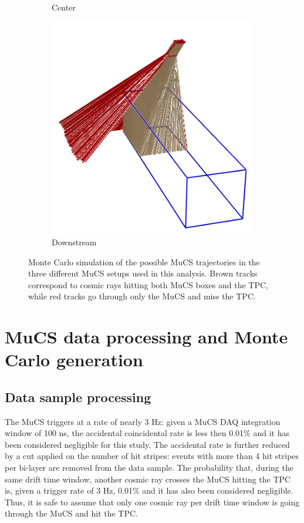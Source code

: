 \documentclass[a4paper,11pt]{article}
\begin{document}
\begin{figure}[htbp]
\begin{subfigure}{0.30\textwidth}
    \caption{Center} \label{fig:centre}
  \end{subfigure}
  \begin{subfigure}{0.30\textwidth}
    \includegraphics[width=\linewidth]{figures/downstream.png}
    \caption{Downstream} \label{fig:downstream}
  \end{subfigure}

  \caption{Monte Carlo simulation of the possible MuCS trajectories in the three different MuCS setups used in this analysis. Brown tracks correspond to cosmic rays hitting both MuCS boxes and the TPC, while red tracks go through only the MuCS and miss the TPC.} \label{fig:mucs}
\end{figure}


\section{MuCS data processing and Monte Carlo generation}\label{sec:merging}

\subsection{Data sample processing}
The MuCS triggers at a rate of nearly 3 Hz: given a MuCS DAQ integration window of 100 ns, the accidental coincidental rate is less then 0.01\% and it has been considered negligible for this study. The accidental rate is further reduced by a cut applied on the number of hit stripes: events with more than 4 hit stripes per bi-layer are removed from the data sample.
The probability that, during the same drift time window, another cosmic ray crosses the MuCS hitting the TPC is, given a trigger rate of 3 Hz, 0.01\% and it has also been considered negligible. Thus, it is safe to assume that only one cosmic ray per drift time window is going through the MuCS and hit the TPC.
\end{document}
